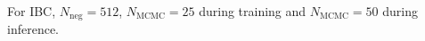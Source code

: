 For IBC, $N_{\text{neg}}=512$, $N_{\text{MCMC}} = 25$ during training and $N_{\text{MCMC}} = 50$ during inference.  



